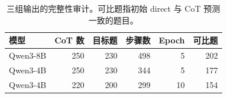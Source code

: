 \begin{table}[H]
\centering
\small
\caption{三组输出的完整性审计。可比题指初始 direct 与 CoT 预测一致的题目。}
\label{tab:config}
\begin{tabular}{lrrrrr}
\toprule
模型 & CoT 数 & 目标题 & 步骤数 & Epoch & 可比题 \\
\midrule
Qwen3-8B & 250 & 230 & 498 & 5 & 202 \\
Qwen3-4B & 250 & 230 & 344 & 5 & 177 \\
Qwen3-4B & 220 & 200 & 299 & 10 & 154 \\
\bottomrule
\end{tabular}
\end{table}
